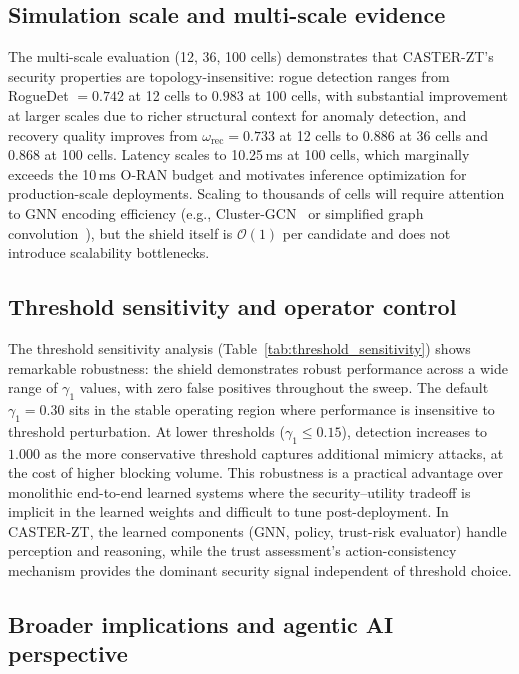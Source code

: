 \documentclass[10pt,journal,compsoc]{IEEEtran}
\begin{document}
\subsection{Simulation scale and multi-scale evidence}
The multi-scale evaluation (12, 36, 100 cells) demonstrates that CASTER-ZT's security properties are topology-insensitive: rogue detection ranges from RogueDet $= 0.742$ at 12 cells to $0.983$ at 100 cells, with substantial improvement at larger scales due to richer structural context for anomaly detection, and recovery quality improves from $\omega_{\mathrm{rec}} = 0.733$ at 12 cells to $0.886$ at 36 cells and $0.868$ at 100 cells.
Latency scales to 10.25\,ms at 100 cells, which marginally exceeds the 10\,ms O-RAN budget and motivates inference optimization for production-scale deployments.
Scaling to thousands of cells will require attention to GNN encoding efficiency (e.g., Cluster-GCN~\cite{chiang2019clustergcn} or simplified graph convolution~\cite{wu2019sgc}), but the shield itself is $\mathcal{O}(1)$ per candidate and does not introduce scalability bottlenecks.

\subsection{Threshold sensitivity and operator control}
The threshold sensitivity analysis (Table~\ref{tab:threshold_sensitivity}) shows remarkable robustness: the shield demonstrates robust performance across a wide range of $\gamma_1$ values, with zero false positives throughout the sweep.
The default $\gamma_1 = 0.30$ sits in the stable operating region where performance is insensitive to threshold perturbation.
At lower thresholds ($\gamma_1 \le 0.15$), detection increases to $1.000$ as the more conservative threshold captures additional mimicry attacks, at the cost of higher blocking volume.
This robustness is a practical advantage over monolithic end-to-end learned systems where the security--utility tradeoff is implicit in the learned weights and difficult to tune post-deployment.
In CASTER-ZT, the learned components (GNN, policy, trust-risk evaluator) handle perception and reasoning, while the trust assessment's action-consistency mechanism provides the dominant security signal independent of threshold choice.

\subsection{Broader implications and agentic AI perspective}
\end{document}

